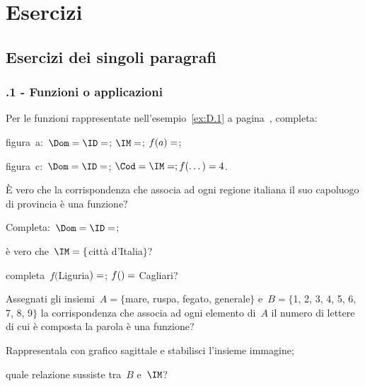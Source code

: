 \section{Esercizi}
\subsection{Esercizi dei singoli paragrafi}
\subsubsection*{\thechapter.1 - Funzioni o applicazioni}
\begin{esercizio}
 \label{ese:D.1}
 Per le funzioni rappresentate nell'esempio~\ref{ex:D.1} a pagina~\pageref{ex:D.1}, completa:

 \begin{itemize*}
\item figura~a:~$\Dom =\ID = \dotfill$; $\IM = \dotfill$; $f(a) = \dotfill$;
\item figura~c:~$\Dom = \ID = \dotfill$; $\Cod = \IM = \dotfill; f(\dots)= 4$.
\end{itemize*}
 \end{esercizio}

\begin{esercizio}
 \label{ese:D.2}
È vero che la corrispondenza che associa ad ogni regione italiana il suo capoluogo di provincia è una
funzione?

\begin{enumeratea}
\item Completa:~$\Dom = \ID = \dotfill$;
\item è vero che~$\IM = \{$città d'Italia$\}$?
\item completa~$f($Liguria$)=\dotfill$; $f(\dotfill)=$ Cagliari?
\end{enumeratea}
\end{esercizio}

\begin{esercizio}
 \label{ese:D.3}
Assegnati gli insiemi~$A=\{$mare, ruspa, fegato, generale$\}$ e~$B=\{$1, 2, 3, 4, 5, 6, 7, 8, 9$\}$ la corrispondenza
che associa ad ogni elemento di~$A$ il numero di lettere di cui è
composta la parola è una funzione?

\begin{enumeratea}
\item Rappresentala con grafico sagittale e stabilisci l'insieme immagine;
\item quale relazione sussiste tra~$B$ e~$\IM$?
\end{enumeratea}
\end{esercizio}

